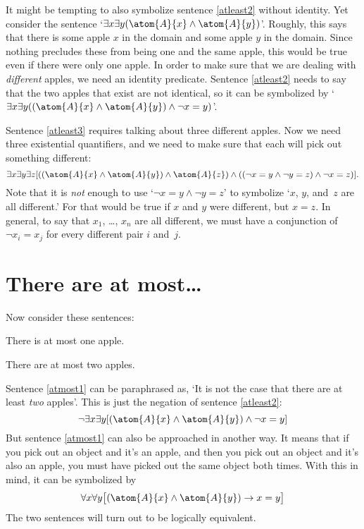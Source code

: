 It might be tempting to also symbolize sentence \ref{atleast2} without identity. Yet consider the sentence `$\exists x \exists y(\atom{A}{x} \eand \atom{A}{y})$'. Roughly, this says that there is some apple $x$ in the domain and some apple $y$ in the domain. Since nothing precludes these from being one and the same apple, this would be true even if there were only one apple. In order to make sure that we are dealing with \emph{different} apples, we need an identity predicate. Sentence \ref{atleast2} needs to say that the two apples that exist are not identical, so it can be symbolized by `$\exists x \exists y((\atom{A}{x} \eand \atom{A}{y}) \eand \enot x = y)$'.

Sentence \ref{atleast3} requires talking about three different apples. Now we need three existential quantifiers, and we need to make sure that each will pick out something different: 
\[
	\exists x \exists y\exists z[((\atom{A}{x} \eand \atom{A}{y}) \eand \atom{A}{z}) \eand ((\enot x = y \eand \enot y = z) \eand \enot x = z)].
\]
Note that it is \emph{not} enough to use `$\lnot x = y \land \lnot y = z$' to symbolize `$x$, $y$, and~$z$ are all different.' For that would be true if $x$ and $y$ were different, but $x = z$. In general, to say that $x_1$, \dots, $x_n$ are all different, we must have a conjunction of $\lnot x_i = x_j$ for every different pair $i$ and~$j$.

\section{There are at most\ldots}
Now consider these sentences:
\begin{earg}
	\item[\ex{atmost1}] There is at most one apple.
	\item[\ex{atmost2}] There are at most two apples.
\end{earg}
Sentence \ref{atmost1} can be paraphrased as, `It is not the case that there are at least \emph{two} apples'. This is just the negation of sentence \ref{atleast2}: 
$$\enot \exists x \exists y[(\atom{A}{x} \eand \atom{A}{y}) \eand \enot x = y]$$
But sentence \ref{atmost1} can also be approached in another way. It means that if you pick out an object and it's an apple, and then you pick out an object and it's also an apple, you must have picked out the same object both times. With this in mind, it can be symbolized by
$$\forall x\forall y\bigl[(\atom{A}{x} \eand \atom{A}{y}) \eif x=y\bigr]$$
The two sentences will turn out to be logically equivalent.

